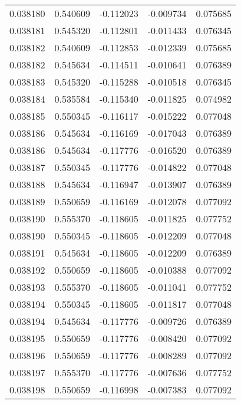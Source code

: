 \begin{tabular}{lrrrr}
0.038180    &  0.540609 & -0.112023 & -0.009734 &             0.075685 \\
0.038181    &  0.545320 & -0.112801 & -0.011433 &             0.076345 \\
0.038182    &  0.540609 & -0.112853 & -0.012339 &             0.075685 \\
0.038182    &  0.545634 & -0.114511 & -0.010641 &             0.076389 \\
0.038183    &  0.545320 & -0.115288 & -0.010518 &             0.076345 \\
0.038184    &  0.535584 & -0.115340 & -0.011825 &             0.074982 \\
0.038185    &  0.550345 & -0.116117 & -0.015222 &             0.077048 \\
0.038186    &  0.545634 & -0.116169 & -0.017043 &             0.076389 \\
0.038186    &  0.545634 & -0.117776 & -0.016520 &             0.076389 \\
0.038187    &  0.550345 & -0.117776 & -0.014822 &             0.077048 \\
0.038188    &  0.545634 & -0.116947 & -0.013907 &             0.076389 \\
0.038189    &  0.550659 & -0.116169 & -0.012078 &             0.077092 \\
0.038190    &  0.555370 & -0.118605 & -0.011825 &             0.077752 \\
0.038190    &  0.550345 & -0.118605 & -0.012209 &             0.077048 \\
0.038191    &  0.545634 & -0.118605 & -0.012209 &             0.076389 \\
0.038192    &  0.550659 & -0.118605 & -0.010388 &             0.077092 \\
0.038193    &  0.555370 & -0.118605 & -0.011041 &             0.077752 \\
0.038194    &  0.550345 & -0.118605 & -0.011817 &             0.077048 \\
0.038194    &  0.545634 & -0.117776 & -0.009726 &             0.076389 \\
0.038195    &  0.550659 & -0.117776 & -0.008420 &             0.077092 \\
0.038196    &  0.550659 & -0.117776 & -0.008289 &             0.077092 \\
0.038197    &  0.555370 & -0.117776 & -0.007636 &             0.077752 \\
0.038198    &  0.550659 & -0.116998 & -0.007383 &             0.077092 \\

\end{tabular}
